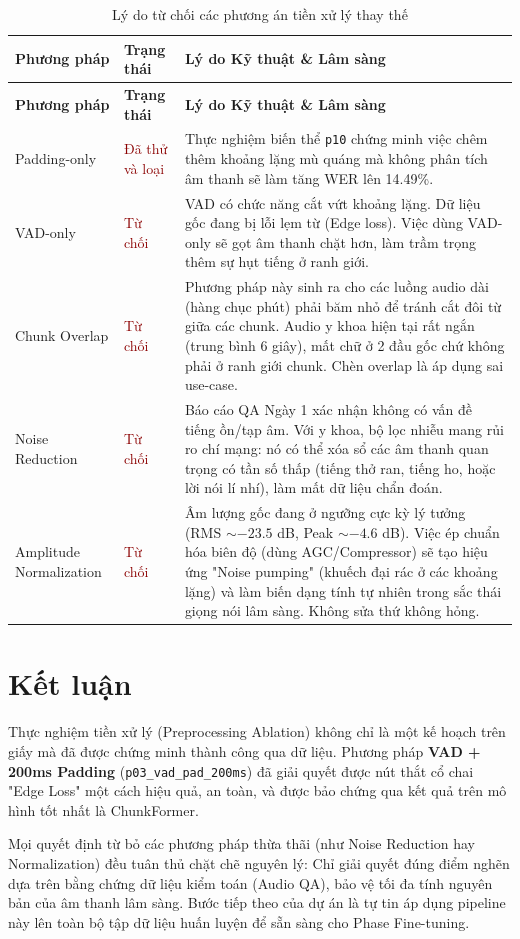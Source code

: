 \documentclass[12pt,a4paper]{article}
\begin{document}
\begin{longtable}{|p{3.5cm}|p{3cm}|p{8.5cm}|}
\caption{Lý do từ chối các phương án tiền xử lý thay thế}\\
\hline
\textbf{Phương pháp} & \textbf{Trạng thái} & \textbf{Lý do Kỹ thuật \& Lâm sàng} \\
\hline
\endfirsthead

\hline
\textbf{Phương pháp} & \textbf{Trạng thái} & \textbf{Lý do Kỹ thuật \& Lâm sàng} \\
\hline
\endhead

Padding-only & \textcolor{darkred}{Đã thử và loại} & Thực nghiệm biến thể \texttt{p10} chứng minh việc chêm thêm khoảng lặng mù quáng mà không phân tích âm thanh sẽ làm tăng WER lên 14.49\%. \\
\hline
VAD-only & \textcolor{darkred}{Từ chối} & VAD có chức năng cắt vứt khoảng lặng. Dữ liệu gốc đang bị lỗi lẹm từ (Edge loss). Việc dùng VAD-only sẽ gọt âm thanh chặt hơn, làm trầm trọng thêm sự hụt tiếng ở ranh giới. \\
\hline
Chunk Overlap & \textcolor{darkred}{Từ chối} & Phương pháp này sinh ra cho các luồng audio dài (hàng chục phút) phải băm nhỏ để tránh cắt đôi từ giữa các chunk. Audio y khoa hiện tại rất ngắn (trung bình 6 giây), mất chữ ở 2 đầu gốc chứ không phải ở ranh giới chunk. Chèn overlap là áp dụng sai use-case. \\
\hline
Noise Reduction & \textcolor{darkred}{Từ chối} & Báo cáo QA Ngày 1 xác nhận không có vấn đề tiếng ồn/tạp âm. Với y khoa, bộ lọc nhiễu mang rủi ro chí mạng: nó có thể xóa sổ các âm thanh quan trọng có tần số thấp (tiếng thở ran, tiếng ho, hoặc lời nói lí nhí), làm mất dữ liệu chẩn đoán. \\
\hline
Amplitude Normalization & \textcolor{darkred}{Từ chối} & Âm lượng gốc đang ở ngưỡng cực kỳ lý tưởng (RMS $\sim -23.5$ dB, Peak $\sim -4.6$ dB). Việc ép chuẩn hóa biên độ (dùng AGC/Compressor) sẽ tạo hiệu ứng "Noise pumping" (khuếch đại rác ở các khoảng lặng) và làm biến dạng tính tự nhiên trong sắc thái giọng nói lâm sàng. Không sửa thứ không hỏng. \\
\hline
\end{longtable}

\section{Kết luận}

Thực nghiệm tiền xử lý (Preprocessing Ablation) không chỉ là một kế hoạch trên giấy mà đã được chứng minh thành công qua dữ liệu. Phương pháp \textbf{VAD + 200ms Padding} (\texttt{p03\_vad\_pad\_200ms}) đã giải quyết được nút thắt cổ chai "Edge Loss" một cách hiệu quả, an toàn, và được bảo chứng qua kết quả trên mô hình tốt nhất là ChunkFormer.

Mọi quyết định từ bỏ các phương pháp thừa thãi (như Noise Reduction hay Normalization) đều tuân thủ chặt chẽ nguyên lý: Chỉ giải quyết đúng điểm nghẽn dựa trên bằng chứng dữ liệu kiểm toán (Audio QA), bảo vệ tối đa tính nguyên bản của âm thanh lâm sàng. Bước tiếp theo của dự án là tự tin áp dụng pipeline này lên toàn bộ tập dữ liệu huấn luyện để sẵn sàng cho Phase Fine-tuning.
\end{document}
